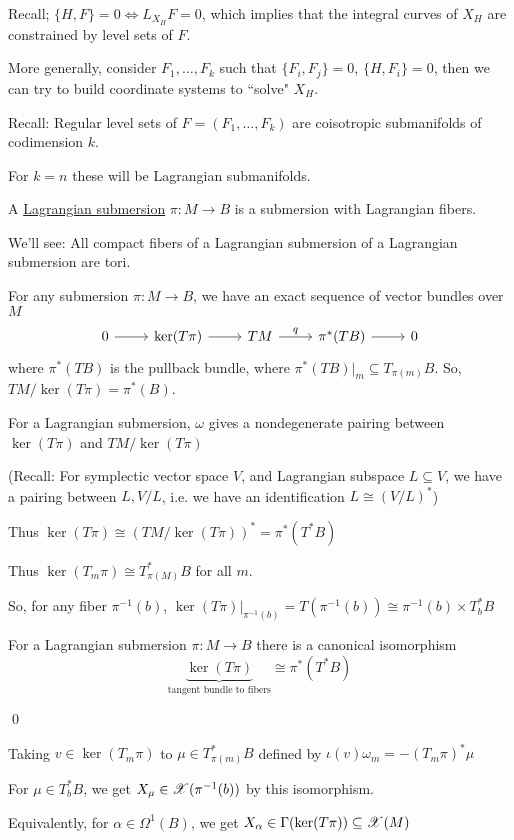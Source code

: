 \documentclass[x11names,reqno,14pt]{extarticle}
\newcommand{\pois}[2]{\{#1,#2\}}
\begin{document}
Recall; $\pois{H}{F} = 0 \iff L_{X_H}F = 0$, which implies that the integral curves of $X_H$ are constrained by level sets of $F$. 

More generally, consider $F_1,\dots,F_k$ such that $\pois{F_i}{F_j} = 0$, $\pois{H}{F_i} = 0$, then we can try to build coordinate systems to ``solve" $X_H$.

Recall: Regular level sets of $F = (F_1,\dots, F_k)$ are coisotropic submanifolds of codimension $k$. 

For $k = n$ these will be Lagrangian submanifolds. 


A \underline{Lagrangian submersion} $\pi:M\to B$ is a submersion with Lagrangian fibers. 

We'll see: All compact fibers of a Lagrangian submersion of a Lagrangian submersion are tori. 

For any submersion $\pi:M\to B$, we have an exact sequence of vector bundles over $M$
\[
\exactshort{\ker(T\pi)}{}{TM}{q}{\pi^*(TB)}
\]
where $\pi^*(TB)$ is the pullback bundle, where $\pi^*(TB)|_m \subseteq T_{\pi(m)}B$. So, $TM/\ker(T\pi) = \pi^*(B)$.

For a Lagrangian submersion, $\omega$ gives a nondegenerate pairing between $\ker(T\pi)$ and $TM/\ker(T\pi)$

(Recall: For symplectic vector space $V$, and Lagrangian subspace $L\subseteq V$, we have a pairing between $L, V/L$, i.e. we have an identification $L \cong (V/L)^*$)

Thus $\ker(T\pi) \cong (TM/\ker(T\pi))^* = \pi^*(T^*B)$

Thus $\ker(T_m\pi) \cong T_{\pi(M)}^*B$ for all $m$.

So, for any fiber $\pi^{-1}(b)$, $\ker(T\pi)|_{\pi^{-1}(b)} = T(\pi^{-1}(b)) \cong \pi^{-1}(b)\times T^*_bB$

\prop

For a Lagrangian submersion $\pi:M\to B$ there is a canonical isomorphism 
\[
\underbrace{\ker(T\pi)}_{\text{tangent bundle to fibers}} \cong \pi^*(T^*B)
\]

\proof

\qed

Taking $v \in \ker(T_m\pi)$ to $\mu\in T_{\pi(m)}^*B$ defined by $\iota(v)\omega_m = -(T_m\pi)^*\mu$

For $\mu\in T_b^*B$, we get $X_\mu \in \mathscr{X}(\pi^{-1}(b))$ by this isomorphism.

Equivalently, for $\alpha\in\Omega^1(B)$, we get $X_\alpha \in \Gamma(\ker(T\pi))\subseteq \mathscr{X}(M)$
\end{document}
